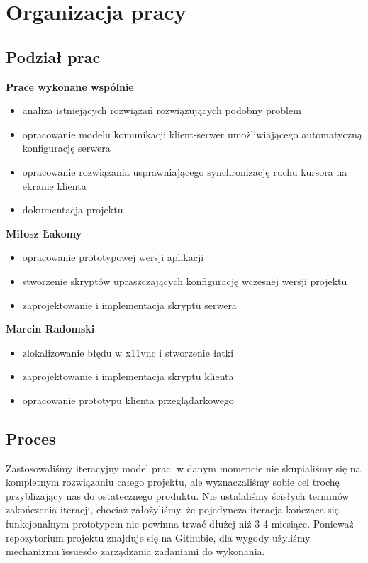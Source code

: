   \vfill

\section{Organizacja pracy}

  \subsection{Podział prac}

    \textbf{Prace wykonane wspólnie}
    \begin{itemize}[noitemsep]
      \item analiza istniejących rozwiązań rozwiązujących podobny problem
      \item opracowanie modelu komunikacji klient-serwer umożliwiającego automatyczną konfigurację serwera
      \item opracowanie rozwiązania usprawniającego synchronizację ruchu kursora na ekranie klienta
      \item dokumentacja projektu
    \end{itemize}

    \noindent
    \textbf{Miłosz Łakomy}
    \begin{itemize}[noitemsep]
      \item opracowanie prototypowej wersji aplikacji
      \item stworzenie skryptów upraszczających konfigurację wczesnej wersji projektu
      \item zaprojektowanie i implementacja skryptu serwera
    \end{itemize}

    \noindent
    \textbf{Marcin Radomski}
    \begin{itemize}[noitemsep]
      \item zlokalizowanie błędu w x11vnc i stworzenie łatki
      \item zaprojektowanie i implementacja skryptu klienta
      \item opracowanie prototypu klienta przeglądarkowego
    \end{itemize}

  \subsection{Proces}

    Zastosowaliśmy iteracyjny model prac: w danym momencie nie skupialiśmy się na kompletnym rozwiązaniu całego projektu, ale wyznaczaliśmy sobie cel trochę przybliżający nas do ostatecznego produktu. Nie ustalaliśmy ścisłych terminów zakończenia iteracji, chociaż założyliśmy, że pojedyncza iteracja kończąca się funkcjonalnym prototypem nie powinna trwać dłużej niż 3-4 miesiące. Ponieważ repozytorium projektu znajduje się na Githubie, dla wygody użyliśmy mechanizmu \"issues\" do zarządzania zadaniami do wykonania.

